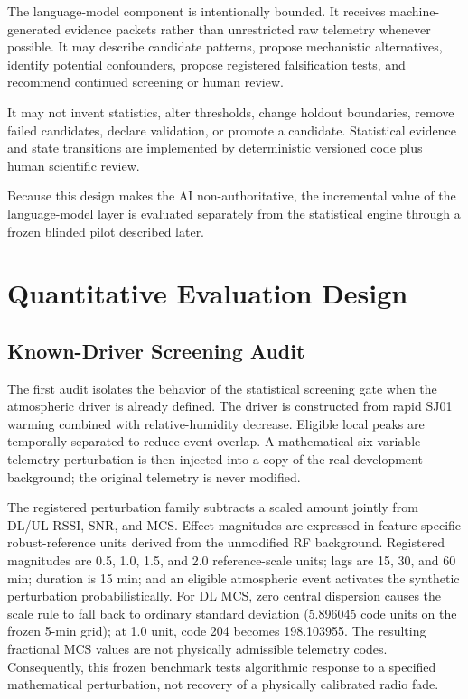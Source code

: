\documentclass{ieeeaccess}
\begin{document}
The language-model component is intentionally bounded. It receives machine-generated evidence packets rather than unrestricted raw telemetry whenever possible. It may describe candidate patterns, propose mechanistic alternatives, identify potential confounders, propose registered falsification tests, and recommend continued screening or human review.

It may not invent statistics, alter thresholds, change holdout boundaries, remove failed candidates, declare validation, or promote a candidate. Statistical evidence and state transitions are implemented by deterministic versioned code plus human scientific review.

Because this design makes the AI non-authoritative, the incremental value of the language-model layer is evaluated separately from the statistical engine through a frozen blinded pilot described later.

\section{Quantitative Evaluation Design}\label{quantitative-evaluation-design}

\subsection{Known-Driver Screening Audit}\label{known-driver-screening-audit}

The first audit isolates the behavior of the statistical screening gate when the atmospheric driver is already defined. The driver is constructed from rapid SJ01 warming combined with relative-humidity decrease. Eligible local peaks are temporally separated to reduce event overlap. A mathematical six-variable telemetry perturbation is then injected into a copy of the real development background; the original telemetry is never modified.

The registered perturbation family subtracts a scaled amount jointly from DL/UL RSSI, SNR, and MCS. Effect magnitudes are expressed in feature-specific robust-reference units derived from the unmodified RF background. Registered magnitudes are 0.5, 1.0, 1.5, and 2.0 reference-scale units; lags are 15, 30, and 60 min; duration is 15 min; and an eligible atmospheric event activates the synthetic perturbation probabilistically. For DL MCS, zero central dispersion causes the scale rule to fall back to ordinary standard deviation (5.896045 code units on the frozen 5-min grid); at 1.0 unit, code 204 becomes 198.103955. The resulting fractional MCS values are not physically admissible telemetry codes. Consequently, this frozen benchmark tests algorithmic response to a specified mathematical perturbation, not recovery of a physically calibrated radio fade.
\end{document}
